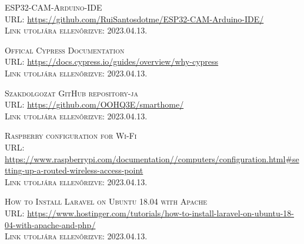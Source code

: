\documentclass[
]{thesis-ekf}
\theoremstyle{definition}
\theoremstyle{remark}
\begin{document}
\begin{thebibliography}{46}
		\textsc{ESP32-CAM-Arduino-IDE}\\
		\textsc{URL:} \url{https://github.com/RuiSantosdotme/ESP32-CAM-Arduino-IDE/}\\
		\textsc{Link utoljára ellenőrizve:} 2023.04.13.
		
		\textsc{Offical Cypress Documentation}\\
		\textsc{URL:} \url{https://docs.cypress.io/guides/overview/why-cypress}\\
		\textsc{Link utoljára ellenőrizve:} 2023.04.13.
		
		\textsc{Szakdolgozat GitHub repository-ja}\\
		\textsc{URL:} \url{https://github.com/OOHQ3E/smarthome/}\\
		\textsc{Link utoljára ellenőrizve:} 2023.04.13.
		
		\textsc{Raspberry configuration for Wi-Fi}\\
		\textsc{URL:} \url{https://www.raspberrypi.com/documentation//computers/configuration.html#setting-up-a-routed-wireless-access-point}\\
		\textsc{Link utoljára ellenőrizve:} 2023.04.13.
		
		\textsc{How to Install Laravel on Ubuntu 18.04 with Apache}\\
		\textsc{URL:} \url{https://www.hostinger.com/tutorials/how-to-install-laravel-on-ubuntu-18-04-with-apache-and-php/}\\
		\textsc{Link utoljára ellenőrizve:} 2023.04.13.
				
	\end{thebibliography}
	
	
\end{document}
